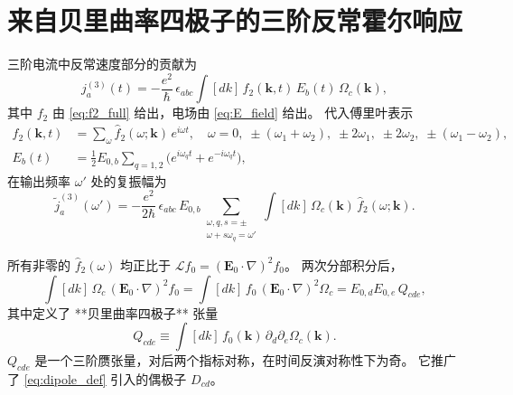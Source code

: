 \section{来自贝里曲率四极子的三阶反常霍尔响应}
\label{sec:third_order}

三阶电流中反常速度部分的贡献为
\begin{equation}
j^{(3)}_a(t) = -\frac{e^2}{\hbar}\,\epsilon_{abc}\int [dk]\,
f_2(\mathbf{k},t)\,E_b(t)\,\Omega_c(\mathbf{k}),
\label{eq:j3_def}
\end{equation}
其中 \(f_2\) 由 \eqref{eq:f2_full} 给出，电场由 \eqref{eq:E_field} 给出。
代入傅里叶表示
\begin{align}
f_2(\mathbf{k},t) &= \sum_{\omega} \hat f_2(\omega;\mathbf{k})\, e^{i\omega t},
\quad \omega = 0,\; \pm(\omega_1+\omega_2),\; \pm 2\omega_1,\; \pm 2\omega_2,\; \pm(\omega_1-\omega_2), \label{eq:f2_Fourier}\\
E_b(t) &= \frac12 E_{0,b}\sum_{q=1,2}\big(e^{i\omega_q t} + e^{-i\omega_q t}\big),
\end{align}
在输出频率 \(\omega'\) 处的复振幅为
\begin{equation}
\tilde j^{(3)}_a(\omega') = -\frac{e^2}{2\hbar}\,\epsilon_{abc}\,E_{0,b}
\sum_{\substack{\omega,q,s=\pm\\ \omega + s\omega_q = \omega'}}
\int [dk]\, \Omega_c(\mathbf{k})\, \hat f_2(\omega;\mathbf{k}).
\label{eq:j3_amplitude}
\end{equation}

所有非零的 \(\hat f_2(\omega)\) 均正比于 \(\mathcal{L}f_0 = (\mathbf{E}_0\!\cdot\!\nabla)^2 f_0\)。
两次分部积分后，
\begin{equation}
\int [dk]\, \Omega_c\, (\mathbf{E}_0\!\cdot\!\nabla)^2 f_0 = \int [dk]\, f_0\, (\mathbf{E}_0\!\cdot\!\nabla)^2\Omega_c
= E_{0,d}E_{0,e}\, Q_{cde},
\end{equation}
其中定义了 **贝里曲率四极子** 张量
\begin{equation}
Q_{cde} \equiv \int [dk]\, f_0(\mathbf{k})\, \partial_d\partial_e\Omega_c(\mathbf{k}).
\label{eq:quadrupole_def}
\end{equation}
\(Q_{cde}\) 是一个三阶赝张量，对后两个指标对称，在时间反演对称性下为奇。
它推广了 \eqref{eq:dipole_def} 引入的偶极子 \(D_{cd}\)。

